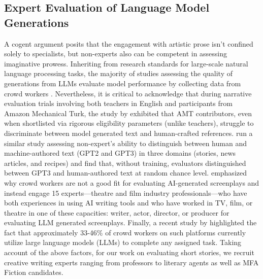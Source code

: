 \subsection{Expert Evaluation of Language Model Generations}
A cogent argument posits that the engagement with artistic prose isn't confined solely to specialists, but non-experts also can be competent in assessing imaginative prowess. Inheriting from research standards for large-scale natural language processing tasks, the majority of studies assessing the quality of generations from LLMs evaluate model performance by collecting data from crowd workers \cite{10.1145/3424636.3426903,rashkin-etal-2020-plotmachines,goldfarb-tarrant-etal-2020-content,roemmele-gordon-2018-linguistic,10.1609/aaai.v33i01.33017378}. Nevertheless, it is critical to acknowledge that during narrative evaluation trials involving both teachers in English and participants from Amazon Mechanical Turk, the study by \citet{karpinska-etal-2021-perils} exhibited that AMT contributors, even when shortlisted via rigorous eligibility parameters (unlike teachers), struggle to discriminate between model generated text and human-crafted references. \citet{clark-etal-2021-thats} run a similar study assessing non-expert's ability to distinguish between human and machine-authored text (GPT2 and GPT3) in three domains (stories, news articles, and recipes) and find that, without training, evaluators distinguished between GPT3 and human-authored text at random chance level. \citet{mirowski2023cowriting} emphasized why crowd workers are not a good fit for evaluating AI-generated screenplays and instead engage 15 experts—theatre and film industry professionals—who have both experiences in using AI writing tools and who have worked in TV, film, or theatre in one of these capacities: writer, actor, director, or producer for evaluating LLM generated screenplays. Finally, a recent study by \citet{veselovsky2023artificial} highlighted the fact that approximately 33-46\% of crowd workers on such platforms currently utilize large language models (LLMs) to complete any assigned task. Taking account of the above factors, for our work on evaluating short stories, we recruit creative writing experts ranging from professors to literary agents as well as MFA Fiction candidates.